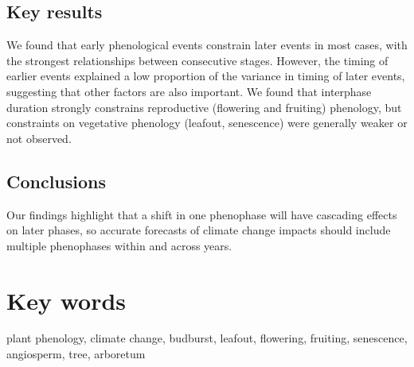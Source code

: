 \documentclass{article}
\begin{document}
\subsection*{Key results}
We found that early phenological events constrain later events in most cases, with the strongest relationships between consecutive stages. However, the timing of earlier events explained a low proportion of the variance in timing of later events, suggesting that other factors are also important. We found that interphase duration strongly constrains reproductive (flowering and fruiting) phenology, but constraints on vegetative phenology (leafout, senescence) were generally weaker or not observed.
\subsection*{Conclusions}
Our findings highlight that a shift in one phenophase will have cascading effects on later phases, so accurate forecasts of climate change impacts should include multiple phenophases within and across years. 

\section* {Key words}
plant phenology, climate change, budburst, leafout, flowering, fruiting, senescence, angiosperm, tree, arboretum
\end{document}

